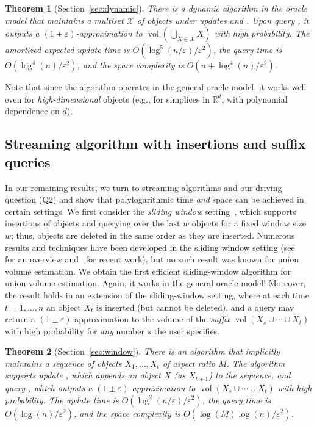 \documentclass[11pt]{article}
\def\Real{\mathbb{R}}
\let\R\Real
\def\vol{\operatorname{vol}}		%
\newtheorem{theorem}{Theorem}[section]
\newcommand{\eps}{\varepsilon}
\newcommand{\class}[1]{\mathcal{#1}}
\begin{document}
\begin{theorem}[Section~\ref{sec:dynamic}]
\label{thm:dynamicalgo}%
There is a dynamic algorithm in the oracle model that maintains a multiset $\class{X}$ of objects under updates  and . Upon query \est{}, it outputs a $(1\pm\eps)$-approximation to $\vol\left(\bigcup_{X \in \class{X}} X\right)$ with high probability. The amortized expected update time is $O(\log^5(n/\eps)/\eps^2)$, the query time is $O(\log^4(n)/\eps^2)$, and the space complexity is $O(n + \log^4(n)/\eps^2)$.
\end{theorem}

%
Note that since the algorithm operates in the general oracle model, it works well even for \emph{high-dimensional} objects (e.g., for simplices in $\R^d$, with polynomial dependence on $d$).
%
%
\subsection{Streaming algorithm with insertions and suffix queries}
%
In our remaining results, we turn to streaming algorithms and our driving question (Q2) and show that polylogarithmic time \emph{and} space can be achieved in certain settings. 
We first consider the \emph{sliding window} setting~\cite{datar2002maintaining}, which supports insertions of objects and querying over the last $w$ objects for a fixed window size $w$;
thus, objects are deleted in the same order as they are inserted. Numerous results and techniques have been developed in the sliding window setting (see~\cite{muthukrishnan2005data,babcock2002models,Braverman16} for an overview and~\cite{woodruff2022tight,JayaramWZ22,FengSW25} for recent work), but no such result was known for union volume estimation.
%
We obtain the first efficient sliding-window algorithm for union volume estimation. Again, it
works in the general oracle model! Moreover, the result holds in an extension of the sliding-window setting, where at each time $t = 1, \dots, n$ an object $X_t$ is inserted (but cannot be deleted), and a query  may return a $(1\pm\eps)$-approximation to the volume of the \emph{suffix} $\vol(X_s \cup \cdots \cup X_t)$ with high probability for \emph{any} number $s$ the user specifies. 
%
\begin{theorem}[Section~\ref{sec:window}]
\label{thm:windowalgo}%
There is an algorithm that implicitly maintains a sequence of objects $X_1, \dots, X_t$ of aspect ratio $M$. The algorithm supports update , which appends an object $X$ (as $X_{t+1}$) to the sequence, and query , which outputs a $(1\pm\eps)$-approximation to $\vol(X_s \cup \cdots \cup X_t)$ with high probability. The update time is $O(\log^2(n/\eps)/\eps^2)$, the query time is $O(\log(n)/\eps^2)$, and the space complexity is $O(\log(M) \log(n)/\eps^2)$.
\end{theorem}
\end{document}
